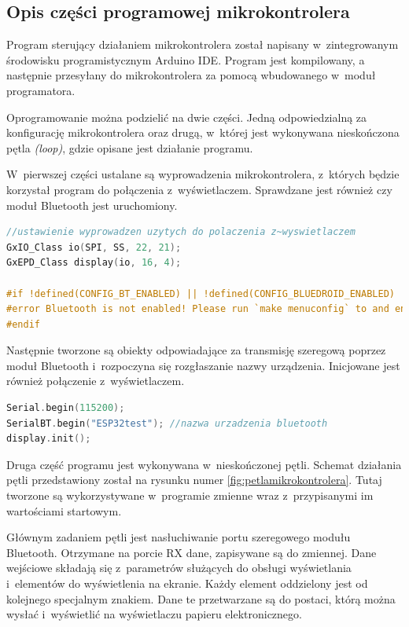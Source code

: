 \documentclass[a4paper,12pt, twoside]{article}
\begin{document}
        \subsection{Opis części programowej mikrokontrolera}
    	Program sterujący działaniem mikrokontrolera został napisany w~zintegrowanym środowisku programistycznym Arduino IDE. Program jest kompilowany, a następnie przesyłany do mikrokontrolera za pomocą wbudowanego w~moduł programatora.

        Oprogramowanie można podzielić na dwie części. Jedną odpowiedzialną za konfigurację mikrokontrolera oraz drugą, w~której jest wykonywana nieskończona pętla \textit{(loop)}, gdzie opisane jest działanie programu.
        
        W~pierwszej części ustalane są wyprowadzenia mikrokontrolera, z~których będzie korzystał program do połączenia z~wyświetlaczem. Sprawdzane jest również czy moduł Bluetooth jest uruchomiony. 
        \begin{lstlisting}[language=C++, caption=Konfiguracja wykorzystanych modułów]
//ustawienie wyprowadzen uzytych do polaczenia z~wyswietlaczem
GxIO_Class io(SPI, SS, 22, 21);
GxEPD_Class display(io, 16, 4);

#if !defined(CONFIG_BT_ENABLED) || !defined(CONFIG_BLUEDROID_ENABLED)
#error Bluetooth is not enabled! Please run `make menuconfig` to and enable it
#endif
\end{lstlisting}

        Następnie tworzone są obiekty odpowiadające za transmisję szeregową poprzez moduł Bluetooth i~rozpoczyna się rozgłaszanie nazwy urządzenia. Inicjowane jest również połączenie z~wyświetlaczem.
        \begin{lstlisting}[language=C++, caption=Konfiguracja wykorzystanych modułów]
Serial.begin(115200);
SerialBT.begin("ESP32test"); //nazwa urzadzenia bluetooth
display.init();
\end{lstlisting}

    	Druga część programu jest wykonywana w~nieskończonej pętli. Schemat działania pętli przedstawiony został na rysunku numer \ref{fig:petlamikrokontrolera}. Tutaj tworzone są wykorzystywane w~programie zmienne wraz z~przypisanymi im wartościami startowym.
    	
    	Głównym zadaniem pętli jest nasłuchiwanie portu szeregowego modułu Bluetooth. Otrzymane na porcie RX dane, zapisywane są do zmiennej. Dane wejściowe składają się z~parametrów służących do obsługi wyświetlania i~elementów do wyświetlenia na ekranie. Każdy element oddzielony jest od kolejnego specjalnym znakiem. Dane te przetwarzane są do postaci, którą można wysłać i~wyświetlić na wyświetlaczu papieru elektronicznego. 
    	
\end{document}
